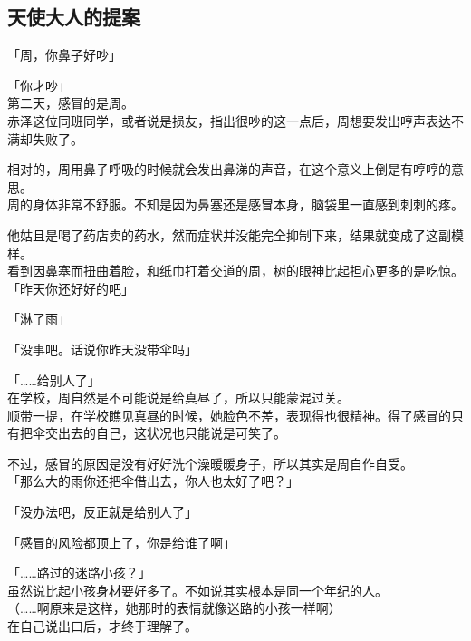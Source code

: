 \subsection{天使大人的提案}

「周，你鼻子好吵」

「你才吵」\\

第二天，感冒的是周。\\

赤泽这位同班同学，或者说是损友，指出很吵的这一点后，周想要发出哼声表达不满却失败了。

相对的，周用鼻子呼吸的时候就会发出鼻涕的声音，在这个意义上倒是有哼哼的意思。\\

周的身体非常不舒服。不知是因为鼻塞还是感冒本身，脑袋里一直感到刺刺的疼。

他姑且是喝了药店卖的药水，然而症状并没能完全抑制下来，结果就变成了这副模样。\\

看到因鼻塞而扭曲着脸，和纸巾打着交道的周，树的眼神比起担心更多的是吃惊。\\

「昨天你还好好的吧」

「淋了雨」

「没事吧。话说你昨天没带伞吗」

「……给别人了」\\

在学校，周自然是不可能说是给真昼了，所以只能蒙混过关。\\

顺带一提，在学校瞧见真昼的时候，她脸色不差，表现得也很精神。得了感冒的只有把伞交出去的自己，这状况也只能说是可笑了。

不过，感冒的原因是没有好好洗个澡暖暖身子，所以其实是周自作自受。\\

「那么大的雨你还把伞借出去，你人也太好了吧？」

「没办法吧，反正就是给别人了」

「感冒的风险都顶上了，你是给谁了啊」

「……路过的迷路小孩？」\\

虽然说比起小孩身材要好多了。不如说其实根本是同一个年纪的人。\\

（……啊原来是这样，她那时的表情就像迷路的小孩一样啊）\\

在自己说出口后，才终于理解了。

